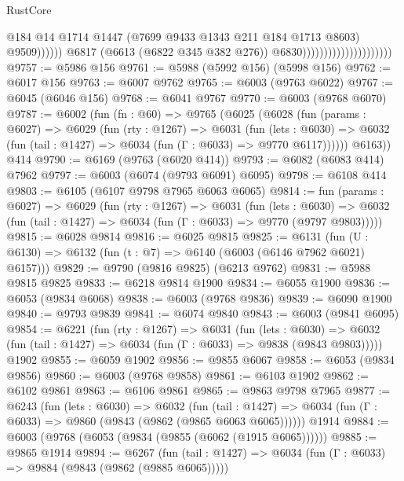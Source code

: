 \begin{lexlean}{RustCore}
\begin{coremodule}
                                                          @184
                                                          @14
                                                          @1714
                                                          @1447
                                                          (@7699 @9433 @1343 @211 @184 @1713 @8603)
                                                          @9509))))))
                                              @6817
                                              (@6613 (@6822 @345 @382 @276))
                                              @6830)))))))))))))))))))))
@9757 := @5986 @156
@9761 := @5988 (@5992 @156) (@5998 @156)
@9762 := @6017 @156
@9763 := @6007 @9762
@9765 := @6003 (@9763 @6022)
@9767 := @6045 (@6046 @156)
@9768 := @6041 @9767
@9770 := @6003 (@9768 @6070)
@9787 := @6002
    (fun (fn : @60) =>
    @9765
      (@6025
        (@6028
          (fun (params : @6027) =>
          @6029
            (fun (rty : @1267) =>
            @6031
              (fun (lets : @6030) =>
              @6032 (fun (tail : @1427) => @6034 (fun (Γ : @6033) => @9770 @6117))))))
        @6163))
    @414
@9790 := @6169 (@9763 (@6020 @414))
@9793 := @6082 (@6083 @414) @7962
@9797 := @6003 (@6074 (@9793 @6091) @6095)
@9798 := @6108 @414
@9803 := @6105 (@6107 @9798 @7965 @6063 @6065)
@9814 := fun (params : @6027) =>
  @6029
    (fun (rty : @1267) =>
    @6031
      (fun (lets : @6030) =>
      @6032 (fun (tail : @1427) => @6034 (fun (Γ : @6033) => @9770 (@9797 @9803)))))
@9815 := @6028 @9814
@9816 := @6025 @9815
@9825 := @6131 (fun (U : @6130) => @6132 (fun (t : @7) => @6140 (@6003 (@6146 @7962 @6021) @6157)))
@9829 := @9790 (@9816 @9825) (@6213 @9762)
@9831 := @5988 @9815 @9825
@9833 := @6218 @9814 @1900
@9834 := @6055 @1900
@9836 := @6053 (@9834 @6068)
@9838 := @6003 (@9768 @9836)
@9839 := @6090 @1900
@9840 := @9793 @9839
@9841 := @6074 @9840
@9843 := @6003 (@9841 @6095)
@9854 := @6221
    (fun (rty : @1267) =>
    @6031
      (fun (lets : @6030) =>
      @6032 (fun (tail : @1427) => @6034 (fun (Γ : @6033) => @9838 (@9843 @9803)))))
    @1902
@9855 := @6059 @1902
@9856 := @9855 @6067
@9858 := @6053 (@9834 @9856)
@9860 := @6003 (@9768 @9858)
@9861 := @6103 @1902
@9862 := @6102 @9861
@9863 := @6106 @9861
@9865 := @9863 @9798 @7965
@9877 := @6243
    (fun (lets : @6030) =>
    @6032
      (fun (tail : @1427) => @6034 (fun (Γ : @6033) => @9860 (@9843 (@9862 (@9865 @6063 @6065))))))
    @1914
@9884 := @6003 (@9768 (@6053 (@9834 (@9855 (@6062 (@1915 @6065))))))
@9885 := @9865 @1914
@9894 := @6267
    (fun (tail : @1427) => @6034 (fun (Γ : @6033) => @9884 (@9843 (@9862 (@9885 @6065)))))

\end{coremodule}
\end{lexlean}
